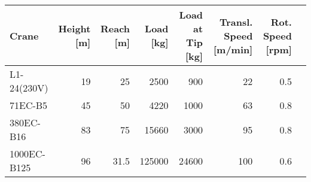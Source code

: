 \documentclass{standalone}
\begin{document}
\begin{tabular}{lrrrrrrr}\toprule
    \textbf{Crane}
        & \textbf{Height [m]}
        & \textbf{Reach [m]}
        & \textbf{Load [kg]}
        & \textbf{Load at Tip [kg]}
        & \textbf{Transl. Speed [m/min]}
        & \textbf{Rot. Speed [rpm]} \\
    \midrule
    L1-24(230V) & 19 & 25 & 2500 & 900 & 22 & 0.5 \\
    71EC-B5 & 45 & 50 & 4220 & 1000 & 63 & 0.8 \\
    380EC-B16 & 83 & 75 & 15660 & 3000 & 95 & 0.8 \\
    1000EC-B125 & 96 & 31.5 & 125000 & 24600 & 100 & 0.6 \\
    \bottomrule
\end{tabular}
\end{document}
